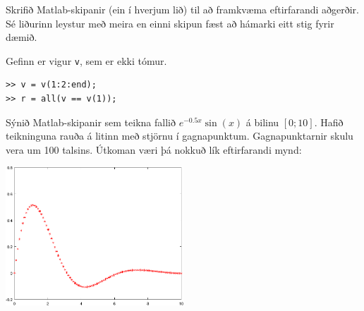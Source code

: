 \documentclass[addpoints]{exam}
\begin{document}
\begin{questions}

\question Skrifið Matlab-skipanir (ein í hverjum lið) til að framkvæma eftirfarandi aðgerðir. Sé liðurinn leystur með meira en einni skipun fæst að hámarki eitt stig fyrir dæmið. 

Gefinn er vigur \texttt{v}, sem er ekki tómur. 

\begin{solution}

\begin{verbatim}
>> v = v(1:2:end);
>> r = all(v == v(1));
\end{verbatim}

\end{solution}

\newpage
\question[4] Sýnið Matlab-skipanir sem teikna fallið $e^{-0.5x}\sin(x)$ á bilinu $[0;10]$. Hafið teikninguna rauða á litinn með stjörnu í gagnapunktum. Gagnapunktarnir skulu vera um 100 talsins.
Útkoman væri þá nokkuð lík eftirfarandi mynd:
\begin{center}
\includegraphics[width=0.5\textwidth]{Pics/expsin}
\end{center}


\end{questions}
\end{document}
